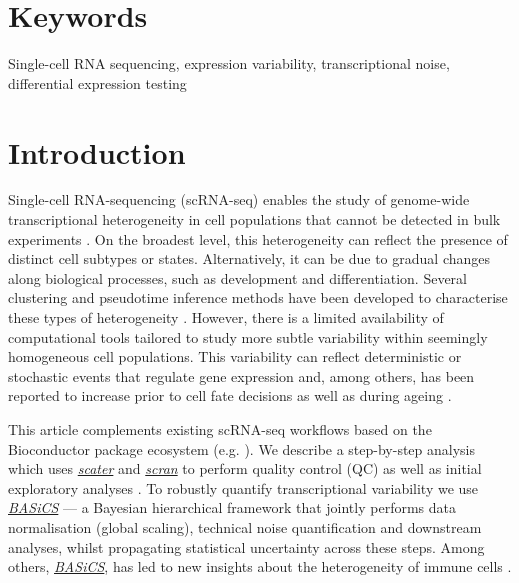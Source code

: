 \documentclass[9pt,a4paper,]{extarticle}
\begin{document}
\section*{Keywords}
Single-cell RNA sequencing, expression variability, transcriptional noise, differential expression testing


\clearpage
\pagestyle{main}

\hypertarget{introduction}{%
\section{Introduction}\label{introduction}}

Single-cell RNA-sequencing (scRNA-seq) enables the study of genome-wide
transcriptional heterogeneity in cell populations that cannot be
detected in bulk experiments \citep{Stegle2015, Prakadan2017, Patange2018}.
On the broadest level, this heterogeneity can reflect the presence of distinct
cell subtypes or states.
Alternatively, it can be due to gradual changes along biological processes, such
as development and differentiation.
Several clustering and pseudotime inference methods have been developed to
characterise these types of heterogeneity \citep{Kiselev2019, Saelens2019}.
However, there is a limited availability of computational tools tailored
to study more subtle variability within seemingly homogeneous cell populations.
This variability can reflect deterministic or stochastic events that regulate
gene expression and, among others, has been reported to increase prior to cell
fate decisions \citep{Mojtahedi2016} as well as during ageing \citep{Martinez-jimenez2017}.

This article complements existing scRNA-seq workflows based on the
Bioconductor package ecosystem (e.g. \citep{Lun2016, Kim2019}).
We describe a step-by-step analysis which uses \emph{\href{https://bioconductor.org/packages/3.11/scater}{scater}} and
\emph{\href{https://bioconductor.org/packages/3.11/scran}{scran}} to perform quality control (QC) as well as
initial exploratory analyses \citep{McCarthy2017, Lun2016}.
To robustly quantify transcriptional variability we use \emph{\href{https://bioconductor.org/packages/3.11/BASiCS}{BASiCS}} \citep{Vallejos2015, Vallejos2016, Eling2017} --- a Bayesian hierarchical framework
that jointly performs data normalisation (global scaling), technical noise
quantification and downstream analyses, whilst propagating statistical
uncertainty across these steps.
Among others, \emph{\href{https://bioconductor.org/packages/3.11/BASiCS}{BASiCS}}, has led to new insights about the
heterogeneity of immune cells \citep{Martinez-jimenez2017}.
\end{document}
